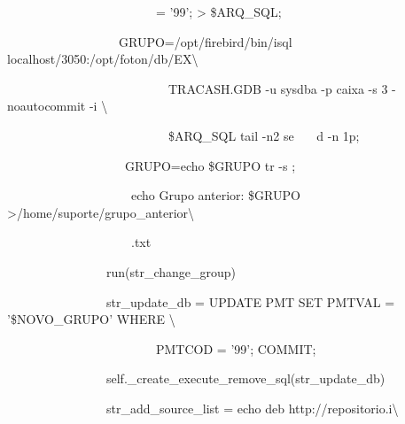 {\ttfamily\color[rgb]{0.10980392,0.10980392,0.10980392}
    \ \ \ \ \ \ \ \ \ \ \ \ \ \ \ \ \ \ \ \ \ \ \ \ = '99';{\textquotedbl} {\textgreater} \$ARQ\_SQL;}

{\ttfamily\color[rgb]{0.10980392,0.10980392,0.10980392}
    \ \ \ \ \ \ \ \ \ \ \ \ \ \ \ \ \ \ GRUPO={\textasciigrave}/opt/firebird/bin/isql
        localhost/3050:/opt/foton/db/EX{\textbackslash}}

{\ttfamily\color[rgb]{0.10980392,0.10980392,0.10980392}
    \ \ \ \ \ \ \ \ \ \ \ \ \ \ \ \ \ \ \ \ \ \ \ \ \ \ TRACASH.GDB -u sysdba -p caixa -s 3 -noautocommit -i
    {\textbackslash}}

{\ttfamily\color[rgb]{0.10980392,0.10980392,0.10980392}
    \ \ \ \ \ \ \ \ \ \ \ \ \ \ \ \ \ \ \ \ \ \ \ \ \ \ \$ARQ\_SQL {\textbar} tail -n2 {\textbar} se \ \ \ d -n
        1p{\textasciigrave};}

{\ttfamily\color[rgb]{0.10980392,0.10980392,0.10980392}
    \ \ \ \ \ \ \ \ \ \ \ \ \ \ \ \ \ \ \ GRUPO={\textasciigrave}echo \$GRUPO {\textbar} tr -s {\textquotedbl}
    {\textquotedbl}{\textasciigrave};}

{\ttfamily\color[rgb]{0.10980392,0.10980392,0.10980392}
    \ \ \ \ \ \ \ \ \ \ \ \ \ \ \ \ \ \ \ \ echo {\textquotedbl}Grupo anterior: \$GRUPO{\textquotedbl}
    {\textgreater}/home/suporte/grupo\_anterior{\textbackslash}}

{\ttfamily\color[rgb]{0.10980392,0.10980392,0.10980392}
    \ \ \ \ \ \ \ \ \ \ \ \ \ \ \ \ \ \ \ \ .txt{\textquotedbl}{\textquotedbl}{\textquotedbl}}

{\ttfamily\color[rgb]{0.10980392,0.10980392,0.10980392}
    \ \ \ \ \ \ \ \ \ \ \ \ \ \ \ \ run(str\_change\_group)}


    \bigskip

{\ttfamily\color[rgb]{0.10980392,0.10980392,0.10980392}
    \ \ \ \ \ \ \ \ \ \ \ \ \ \ \ \ str\_update\_db = {\textquotedbl}UPDATE PMT SET PMTVAL = '\$NOVO\_GRUPO' WHERE
    {\textbackslash}}

{\ttfamily\color[rgb]{0.10980392,0.10980392,0.10980392}
    \ \ \ \ \ \ \ \ \ \ \ \ \ \ \ \ \ \ \ \ \ \ \ \ PMTCOD = '99'; COMMIT;{\textquotedbl}}

{\ttfamily\color[rgb]{0.10980392,0.10980392,0.10980392}
    \ \ \ \ \ \ \ \ \ \ \ \ \ \ \ \ self.\_create\_execute\_remove\_sql(str\_update\_db)}

{\ttfamily\color[rgb]{0.10980392,0.10980392,0.10980392}
    \ \ \ \ \ \ \ \ \ \ \ \ \ \ \ \ str\_add\_source\_list = {\textquotedbl}{\textquotedbl}{\textquotedbl}echo
    {\textquotedbl}deb http://repositorio.i{\textbackslash}}

